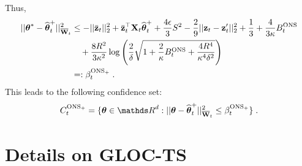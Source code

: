 Thus,
\begin{equation*}\begin{aligned}
||\th^* - \hth^+_t||^2_{\barW_t} 
  &\le -||\bar\z_t||^2_2 + \bar\z_t^\T\X_t\hth^+_t + \fr{4\eps}{3} S^2 -\fr{2}{9}||\z_t - \z'_t||^2_2 + \fr{1}{3} + \fr{4}{3\kap}B^{\ONS}_t 
  \\&\quad + \fr{8R^2}{3\kap^2}\log\lt(\fr{2}{\dt}\sqrt{ 1+ \fr{2}{\kappa}B^{\ONS}_t + \fr{4R^4}{\kappa^4\dt^2} } \rt) %
\\&=:\beta^{\ONS_+}_t \;.
\end{aligned}\end{equation*}
This leads to the following confidence set:
\begin{equation*}
  C^{\ONS_+}_t = \{ \th\in\dsR^d: ||\th - \hth^+_t||^2_{\barW_t} \le \beta^{\ONS_+}_t  \} \;.
\end{equation*}



\vspace{-5pt}
\section{Details on GLOC-TS}
\vspace{-5pt}

